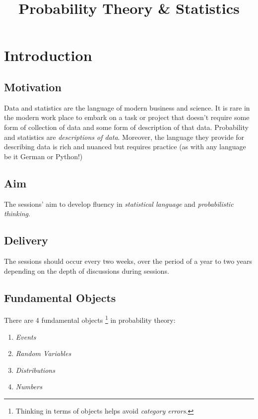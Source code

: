 \documentclass[11pt,a4paper]{article}
\title{Probability Theory \& Statistics}
\begin{document}
\maketitle
\newpage

\section{Introduction}

\subsection{Motivation}

Data and statistics are the language of modern business and science. 
It is rare in the modern work place to embark on a task or project that doesn't require 
some form of collection of data and some form of description of that data. 
Probability and statistics are \emph{descriptions of data}. 
Moreover, the language they provide for describing data is rich and nuanced 
but requires practice (as with any language be it German or Python!)

\subsection{Aim}

The sessions' aim to develop fluency in \emph{statistical language} and \emph{probabilistic thinking}.

\subsection{Delivery}

The sessions should occur every two weeks,
over the period of a year to two years depending on the depth of discussions during sessions.

\subsection{Fundamental Objects}

There are 4 fundamental objects%
\footnote{Thinking in terms of objects helps avoid \emph{category errors}.}
in probability theory:

\begin{enumerate}
\def\labelenumi{\arabic{enumi}.}
\item \emph{Events}
\item \emph{Random Variables}
\item \emph{Distributions}
\item \emph{Numbers}
\end{enumerate}
\end{document}

